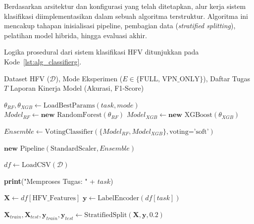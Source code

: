 Berdasarkan arsitektur dan konfigurasi yang telah ditetapkan, alur kerja sistem klasifikasi diimplementasikan dalam sebuah algoritma terstruktur. Algoritma ini mencakup tahapan inisialisasi pipeline, pembagian data (\textit{stratified splitting}), pelatihan model hibrida, hingga evaluasi akhir.

Logika prosedural dari sistem klasifikasi HFV ditunjukkan pada Kode~\ref{lst:alg_classifierg}.

\begin{listing}[H]
    \begin{algorithmic}[1]
        \Require Dataset HFV ($\mathcal{D}$), Mode Eksperimen ($E \in \{\text{FULL, VPN\_ONLY}\}$), Daftar Tugas $T$
        \Ensure Laporan Kinerja Model (Akurasi, F1-Score)

        \Statex {}
            \State $\theta_{RF}, \theta_{XGB} \gets \text{LoadBestParams}(task, mode)$
            \State $Model_{RF} \gets \textbf{new } \text{RandomForest}(\theta_{RF})$
            \State $Model_{XGB} \gets \textbf{new } \text{XGBoost}(\theta_{XGB})$
            
            \State {}
            \State $Ensemble \gets \text{VotingClassifier}(\{Model_{RF}, Model_{XGB}\}, \text{voting='soft'})$
            
            \State {}
            \State \Return $\textbf{new } \text{Pipeline}(\text{StandardScaler}, Ensemble)$
        \EndFunction

        \Statex {}
            \State $df \gets \text{LoadCSV}(\mathcal{D})$
            
                \State \textbf{print}("Memproses Tugas: " + $task$)
                
                \State {}
                \State $\mathbf{X} \gets df[\text{HFV\_Features}]$
                \State $\mathbf{y} \gets \text{LabelEncoder}(df[task])$
                
                \State {}
                \State $\mathbf{X}_{train}, \mathbf{X}_{test}, \mathbf{y}_{train}, \mathbf{y}_{test} \gets \text{StratifiedSplit}(\mathbf{X}, \mathbf{y}, 0.2)$


\end{algorithmic}
\end{listing}
